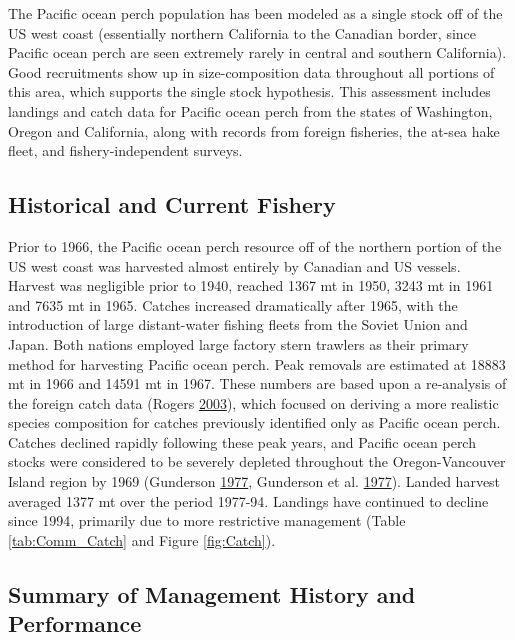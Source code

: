 \documentclass[12pt,]{article}
\begin{document}
The Pacific ocean perch population has been modeled as a single stock
off of the US west coast (essentially northern California to the
Canadian border, since Pacific ocean perch are seen extremely rarely in
central and southern California). Good recruitments show up in
size-composition data throughout all portions of this area, which
supports the single stock hypothesis. This assessment includes landings
and catch data for Pacific ocean perch from the states of Washington,
Oregon and California, along with records from foreign fisheries, the
at-sea hake fleet, and fishery-independent surveys.

\subsection{Historical and Current
Fishery}\label{historical-and-current-fishery}

Prior to 1966, the Pacific ocean perch resource off of the northern
portion of the US west coast was harvested almost entirely by Canadian
and US vessels. Harvest was negligible prior to 1940, reached 1367 mt in
1950, 3243 mt in 1961 and 7635 mt in 1965. Catches increased
dramatically after 1965, with the introduction of large distant-water
fishing fleets from the Soviet Union and Japan. Both nations employed
large factory stern trawlers as their primary method for harvesting
Pacific ocean perch. Peak removals are estimated at 18883 mt in 1966 and
14591 mt in 1967. These numbers are based upon a re-analysis of the
foreign catch data (Rogers
\protect\hyperlink{ref-rogers_species_2003}{2003}), which focused on
deriving a more realistic species composition for catches previously
identified only as Pacific ocean perch. Catches declined rapidly
following these peak years, and Pacific ocean perch stocks were
considered to be severely depleted throughout the Oregon-Vancouver
Island region by 1969 (Gunderson
\protect\hyperlink{ref-gunderson_population_1977}{1977}, Gunderson et
al. \protect\hyperlink{ref-gunderson_status_1977}{1977}). Landed harvest
averaged 1377 mt over the period 1977-94. Landings have continued to
decline since 1994, primarily due to more restrictive management (Table
\ref{tab:Comm_Catch} and Figure \ref{fig:Catch}).

\subsection{Summary of Management History and
Performance}\label{summary-of-management-history-and-performance}
\end{document}
